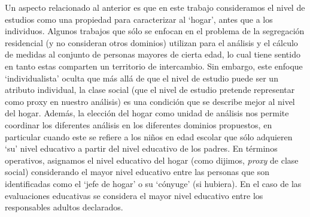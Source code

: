 \documentclass[
  spanish,
  a4paper,%
  chapterprefix=true,%
  DIV=calc,%
  twoside]{scrbook}%
\begin{document}
Un aspecto relacionado al anterior es que en este trabajo consideramos
el nivel de estudios como una propiedad para caracterizar al `hogar',
antes que a los individuos. Algunos trabajos que sólo se enfocan en el
problema de la segregación residencial (y no consideran otros dominios)
utilizan para el análisis y el cálculo de medidas al conjunto de
personas mayores de cierta edad, lo cual tiene sentido en tanto estas
comparten un territorio de intercambio. Sin embargo, este enfoque
`individualista' oculta que más allá de que el nivel de estudio puede
ser un atributo individual, la clase social (que el nivel de estudio
pretende representar como proxy en nuestro análisis) es una condición
que se describe mejor al nivel del hogar. Además, la elección del hogar
como unidad de análisis nos permite coordinar los diferentes análisis en
los diferentes dominios propuestos, en particular cuando este se refiere
a los niños en edad escolar que sólo adquieren `su' nivel educativo a
partir del nivel educativo de los padres. En términos operativos,
asignamos el nivel educativo del hogar (como dijimos, \emph{proxy} de clase
social) considerando el mayor nivel educativo entre las personas que son
identificadas como el `jefe de hogar' o su `cónyuge' (si hubiera). En el
caso de las evaluaciones educativas se considera el mayor nivel
educativo entre los responsables adultos declarados.
\end{document}

